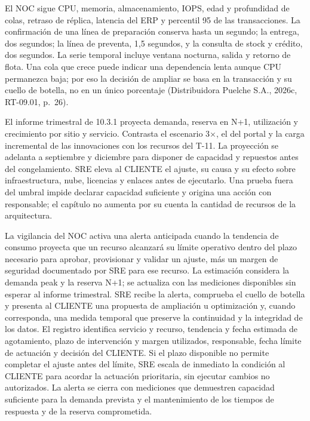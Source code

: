 El NOC sigue CPU, memoria, almacenamiento, IOPS, edad y profundidad de colas, retraso de réplica, latencia del ERP y percentil 95 de las transacciones. La confirmación de una línea de preparación conserva hasta un segundo; la entrega, dos segundos; la línea de preventa, 1,5 segundos, y la consulta de stock y crédito, dos segundos. La serie temporal incluye ventana nocturna, salida y retorno de flota. Una cola que crece puede indicar una dependencia lenta aunque CPU permanezca baja; por eso la decisión de ampliar se basa en la transacción y su cuello de botella, no en un único porcentaje (Distribuidora Puelche S.A., 2026c, RT-09.01, p.~26).

El informe trimestral de 10.3.1 proyecta demanda, reserva en N+1, utilización y crecimiento por sitio y servicio. Contrasta el escenario 3$\times$, el del portal y la carga incremental de las innovaciones con los recursos del T-11. La proyección se adelanta a septiembre y diciembre para disponer de capacidad y repuestos antes del congelamiento. SRE eleva al CLIENTE el ajuste, su causa y su efecto sobre infraestructura, nube, licencias y enlaces antes de ejecutarlo. Una prueba fuera del umbral impide declarar capacidad suficiente y origina una acción con responsable; el capítulo no aumenta por su cuenta la cantidad de recursos de la arquitectura.

La vigilancia del NOC activa una alerta anticipada cuando la tendencia de consumo proyecta que un recurso alcanzará su límite operativo dentro del plazo necesario para aprobar, provisionar y validar un ajuste, más un margen de seguridad documentado por SRE para ese recurso. La estimación considera la demanda peak y la reserva N+1; se actualiza con las mediciones disponibles sin esperar al informe trimestral. SRE recibe la alerta, comprueba el cuello de botella y presenta al CLIENTE una propuesta de ampliación u optimización y, cuando corresponda, una medida temporal que preserve la continuidad y la integridad de los datos. El registro identifica servicio y recurso, tendencia y fecha estimada de agotamiento, plazo de intervención y margen utilizados, responsable, fecha límite de actuación y decisión del CLIENTE. Si el plazo disponible no permite completar el ajuste antes del límite, SRE escala de inmediato la condición al CLIENTE para acordar la actuación prioritaria, sin ejecutar cambios no autorizados. La alerta se cierra con mediciones que demuestren capacidad suficiente para la demanda prevista y el mantenimiento de los tiempos de respuesta y de la reserva comprometida.

